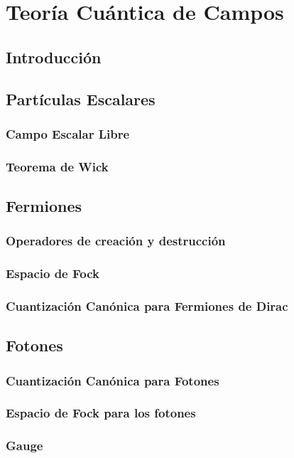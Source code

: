 \chapter{Teoría Cuántica de Campos}

\section{Introducción}

\section{Partículas Escalares}

\subsection{Campo Escalar Libre}

\subsection{Teorema de Wick}

\section{Fermiones}

\subsection{Operadores de creación y destrucción}

\subsection{Espacio de Fock}

\subsection{Cuantización Canónica para Fermiones de Dirac}

\section{Fotones}

\subsection{Cuantización Canónica para Fotones}

\subsection{Espacio de Fock para los fotones}

\subsection{Gauge}

